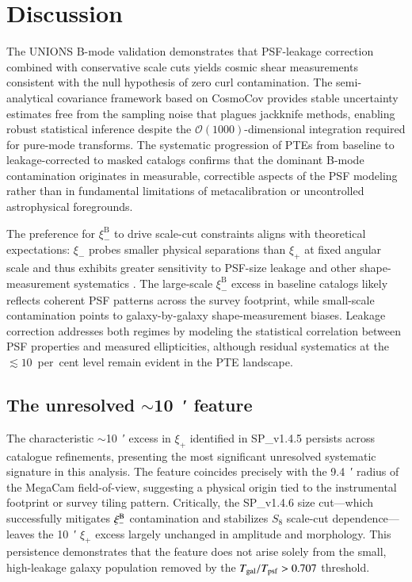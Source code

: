 \documentclass{aa}
\begin{document}
\section{Discussion}

The UNIONS B-mode validation demonstrates that PSF-leakage correction combined with conservative scale cuts yields cosmic shear measurements consistent with the null hypothesis of zero curl contamination. The semi-analytical covariance framework based on CosmoCov provides stable uncertainty estimates free from the sampling noise that plagues jackknife methods, enabling robust statistical inference despite the $\mathcal{O}(1000)$-dimensional integration required for pure-mode transforms. The systematic progression of PTEs from baseline to leakage-corrected to masked catalogs confirms that the dominant B-mode contamination originates in measurable, correctible aspects of the PSF modeling rather than in fundamental limitations of metacalibration or uncontrolled astrophysical foregrounds.

The preference for $\xi_-^{\mathrm{B}}$ to drive scale-cut constraints aligns with theoretical expectations: $\xi_-$ probes smaller physical separations than $\xi_+$ at fixed angular scale and thus exhibits greater sensitivity to PSF-size leakage and other shape-measurement systematics \citep{jarvis.etal16}. The large-scale $\xi_-^{\mathrm{B}}$ excess in baseline catalogs likely reflects coherent PSF patterns across the survey footprint, while small-scale contamination points to galaxy-by-galaxy shape-measurement biases. Leakage correction addresses both regimes by modeling the statistical correlation between PSF properties and measured ellipticities, although residual systematics at the $\lesssim 10$~per~cent level remain evident in the PTE landscape.

\subsection{The unresolved \texorpdfstring{$\sim$\SI{10}{\arcmin}}{10-arcmin} feature}

The characteristic $\sim$\SI{10}{\arcmin} excess in $\xi_+$ identified in SP\_v1.4.5 persists across catalogue refinements, presenting the most significant unresolved systematic signature in this analysis. The feature coincides precisely with the \SI{9.4}{\arcmin} radius of the MegaCam field-of-view, suggesting a physical origin tied to the instrumental footprint or survey tiling pattern. Critically, the SP\_v1.4.6 size cut—which successfully mitigates $\xi_-^{\rm B}$ contamination and stabilizes $S_8$ scale-cut dependence—leaves the \SI{10}{\arcmin} $\xi_+$ excess largely unchanged in amplitude and morphology. This persistence demonstrates that the feature does not arise solely from the small, high-leakage galaxy population removed by the $T_{\rm gal}/T_{\rm psf} > 0.707$ threshold.
\end{document}
